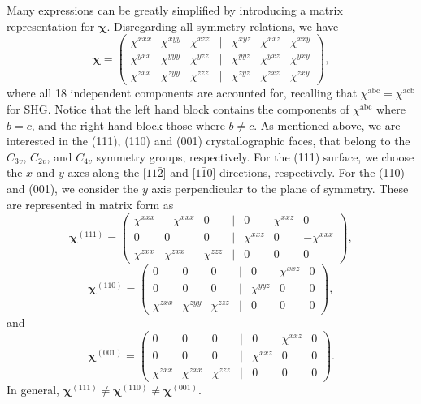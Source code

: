 \documentclass[aps,prb,10pt,showpacs,letterpaper,twocolumn]{revtex4-1}
\begin{document}
{\color{red} Many expressions can be greatly simplified by introducing a matrix
representation for $\boldsymbol{\chi}$. Disregarding all symmetry relations, we
have
\begin{equation}
\boldsymbol{\chi} =
\begin{pmatrix}
\chi^{xxx}&\chi^{xyy}&\chi^{xzz} &|& \chi^{xyz}&\chi^{xxz}&\chi^{xxy} \\[3pt]
\chi^{yxx}&\chi^{yyy}&\chi^{yzz} &|& \chi^{yyz}&\chi^{yxz}&\chi^{yxy} \\[3pt]
\chi^{zxx}&\chi^{zyy}&\chi^{zzz} &|& \chi^{zyz}&\chi^{zxz}&\chi^{zxy}
\end{pmatrix}
,
\end{equation}
where all 18 independent components are accounted for, recalling that
$\chi^{\mathrm{abc}} = \chi^{\mathrm{acb}}$ for SHG. Notice that the left hand
block contains the components of $\chi^{\mathrm{abc}}$ where $b = c$, and the
right hand block those where $b \neq c$. As mentioned above, we are interested
in the (111), (110) and (001) crystallographic faces, that belong to the
$C_{3v}$, $C_{2v}$, and $C_{4v}$ symmetry groups, respectively. For the (111)
surface, we choose the $x$ and $y$ axes along the [$11\bar{2}$] and
[$1\bar{1}0$] directions, respectively. For the (110) and (001), we consider the
$y$ axis perpendicular to the plane of symmetry.\cite{sipePRB87} These are
represented in matrix form as
\begin{equation}\label{eq:111matrix}
\boldsymbol{\chi}^{(111)} =
\begin{pmatrix}
\chi^{xxx}&-\chi^{xxx}&    0      &|&     0     &\chi^{xxz}&     0     \\[3pt]
     0    &      0    &    0      &|& \chi^{xxz}&     0   &-\chi^{xxx}\\[3pt]
\chi^{zxx}& \chi^{zxx}&\chi^{zzz} &|&     0     &     0    &     0 
\end{pmatrix}
,
\end{equation}
\begin{equation}\label{eq:110matrix}
\boldsymbol{\chi}^{(110)} =
\begin{pmatrix}
     0    &     0    &     0     &|&      0    &\chi^{xxz}&     0     \\[3pt]
     0    &     0    &     0     &|& \chi^{yyz}&     0    &     0     \\[3pt]
\chi^{zxx}&\chi^{zyy}&\chi^{zzz} &|&      0    &     0    &     0
\end{pmatrix}
,
\end{equation}
and
\begin{equation}\label{eq:001matrix}
\boldsymbol{\chi}^{(001)} =
\begin{pmatrix}
     0    &     0    &     0     &|&      0    &\chi^{xxz}&     0     \\[3pt]
     0    &     0    &     0     &|& \chi^{xxz}&     0    &     0     \\[3pt]
\chi^{zxx}&\chi^{zxx}&\chi^{zzz} &|&      0    &     0    &     0
\end{pmatrix}
.
\end{equation}
In general, $\boldsymbol{\chi}^{(111)}\ne \boldsymbol{\chi}^{(110)} \ne 
\boldsymbol{\chi}^{(001)}$.
}
\end{document}
